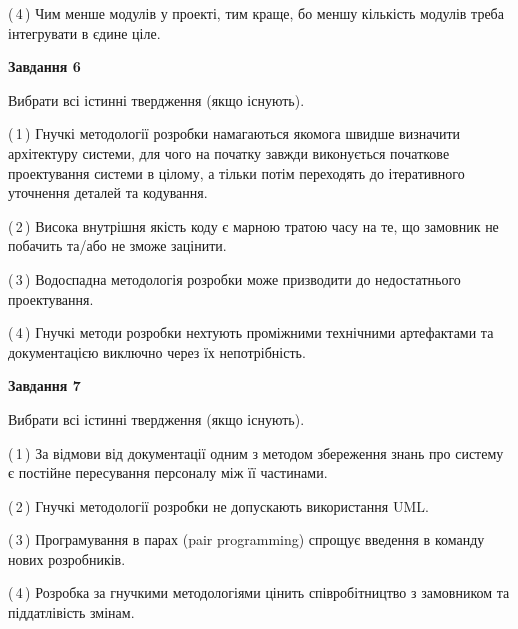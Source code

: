 \documentclass[10pt, ukrainian]{article}
\begin{document}
{\begin {large}
(\,4\,) Чим менше модулів у проекті, тим краще, бо меншу кількість модулів треба інтегрувати в єдине ціле. %

\newpage

{\begin {center}\textbf{Завдання 6}\end {center}}\par
Вибрати всі істинні твердження (якщо існують).\par
\vspace{2mm}



(\,1\,) Гнучкі методології розробки намагаються якомога швидше визначити архітектуру системи, для чого на початку завжди виконується початкове проектування системи в цілому, а тільки потім переходять до ітеративного уточнення деталей та кодування. %



(\,2\,) Висока внутрішня якість коду є марною тратою часу на те, що замовник не побачить та/або не зможе зацінити. %



(\,3\,) Водоспадна методологія розробки може призводити до недостатнього проектування. %



(\,4\,) Гнучкі методи розробки нехтують проміжними технічними артефактами та документацією виключно через їх непотрібність. %


{\begin {center}\textbf{Завдання 7}\end {center}}\par
Вибрати всі істинні твердження (якщо існують).\par
\vspace{2mm}



(\,1\,) За відмови від документації одним з методом збереження знань про систему є постійне пересування персоналу між її частинами. %



(\,2\,) Гнучкі методології розробки не допускають використання UML. %



(\,3\,) Програмування в парах (pair programming) спрощує введення в команду нових розробників. %



(\,4\,) Розробка за гнучкими методологіями цінить співробітництво з замовником та піддатлівість змінам. %



\end{large}}
\end{document}
